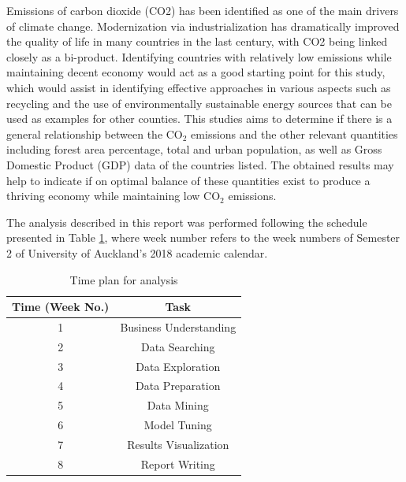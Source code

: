 \documentclass[11pt,a4paper,titlepage]{article}
\newcommand{\blankline}{\quad\pagebreak[2]}
\begin{document}
\blankline

Emissions of carbon dioxide (CO2) has been identified as one of the main drivers of climate change. Modernization via industrialization has dramatically improved the quality of life in many countries in the last century, with CO2 being linked closely as a bi-product. Identifying countries with relatively low emissions while maintaining decent economy would act as a good starting point for this study, which would assist in identifying effective approaches in various aspects such as recycling and the use of environmentally sustainable energy sources that can be used as examples for other counties. This studies aims to determine if there is a general relationship between the CO$_{2}$ emissions and the other relevant quantities including forest area percentage, total and urban population, as well as Gross Domestic Product (GDP) data of the countries listed. The obtained results may help to indicate if on optimal balance of these quantities exist to produce a thriving economy while maintaining low CO$_{2}$ emissions.

\blankline

The analysis described in this report was performed following the schedule presented in Table \ref{ProjectPlan}, where week number refers to the week numbers of Semester 2 of University of Auckland's 2018 academic calendar.

\begin{table}[htbp!]
    \begin{center}
        \begin{tabular}{ |c|c| } 
        \hline
        Time (Week No.) & Task \\ 
        \hline
        1 & Business Understanding \\
        2 & Data Searching \\
        3 & Data Exploration \\
        4 & Data Preparation \\
        5 & Data Mining \\
        6 & Model Tuning \\
        7 & Results Visualization \\
        8 & Report Writing \\
        \hline
        \end{tabular}
        \caption{Time plan for analysis}
        \label{ProjectPlan}
    \end{center}
\end{table}
\end{document}

